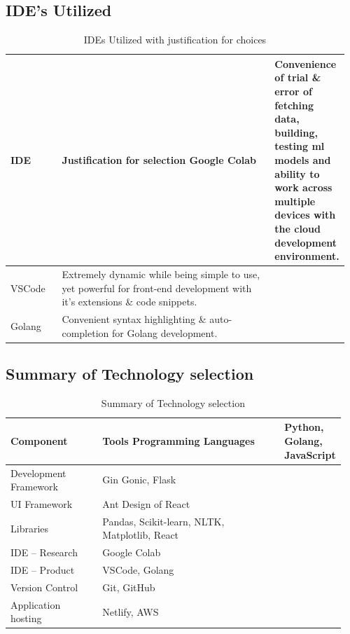 \subsection{IDE’s Utilized}
\vspace{-4mm}
\begin{longtable}{|p{0.16\linewidth}|p{0.8\linewidth}|}
\caption{IDEs Utilized with justification for choices}\\ 
\hline
\textbf{IDE} & \textbf{Justification for selection}\endfirsthead 
\hline
Google Colab & Convenience of trial \& error of fetching data, building, testing \gls{ml} models and ability to work across multiple devices with the cloud development environment. \\
\hline
VSCode & Extremely dynamic while being simple to use, yet powerful for front-end development with it's extensions \& code snippets. \\
\hline
Golang & Convenient syntax highlighting \& auto-completion for Golang development. \\
\hline
\end{longtable}


\subsection{Summary of Technology selection}
\vspace{-4mm}
\begin{longtable}{|p{0.3\linewidth}|p{0.65\linewidth}|}
\caption{Summary of Technology selection}\\ 
\hline
\textbf{Component} & \textbf{Tools}\endfirsthead 
\hline
Programming Languages & Python, Golang, JavaScript \\
\hline
Development Framework & Gin Gonic, Flask \\
\hline
UI Framework & Ant Design of React \\
\hline
Libraries & Pandas, Scikit-learn, NLTK, Matplotlib, React \\
\hline
IDE – Research & Google Colab \\
\hline
IDE – Product & VSCode, Golang \\
\hline
Version Control & Git, GitHub \\
\hline
Application hosting & Netlify, AWS
\\
\hline
\end{longtable}



